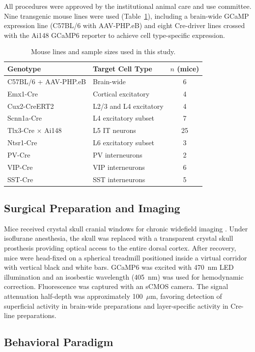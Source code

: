 \documentclass[11pt]{article}
\begin{document}
All procedures were approved by the institutional animal care and use committee. Nine transgenic mouse lines were used (Table~\ref{tab:mice}), including a brain-wide GCaMP expression line (C57BL/6 with AAV-PHP.eB) and eight Cre-driver lines crossed with the Ai148 GCaMP6 reporter to achieve cell type-specific expression.

\begin{table}[h]
\centering
\caption{Mouse lines and sample sizes used in this study.}
\label{tab:mice}
\begin{tabular}{llc}
\toprule
Genotype & Target Cell Type & $n$ (mice) \\
\midrule
C57BL/6 + AAV-PHP.eB & Brain-wide & 6 \\
Emx1-Cre & Cortical excitatory & 4 \\
Cux2-CreERT2 & L2/3 and L4 excitatory & 4 \\
Scnn1a-Cre & L4 excitatory subset & 7 \\
Tlx3-Cre $\times$ Ai148 & L5 IT neurons & 25 \\
Ntsr1-Cre & L6 excitatory subset & 3 \\
PV-Cre & PV interneurons & 2 \\
VIP-Cre & VIP interneurons & 6 \\
SST-Cre & SST interneurons & 5 \\
\bottomrule
\end{tabular}
\end{table}

\subsection{Surgical Preparation and Imaging}

Mice received crystal skull cranial windows for chronic widefield imaging \citep{kim2016}. Under isoflurane anesthesia, the skull was replaced with a transparent crystal skull prosthesis providing optical access to the entire dorsal cortex. After recovery, mice were head-fixed on a spherical treadmill positioned inside a virtual corridor with vertical black and white bars. GCaMP6 was excited with 470~nm LED illumination and an isosbestic wavelength (405~nm) was used for hemodynamic correction. Fluorescence was captured with an sCMOS camera. The signal attenuation half-depth was approximately 100~$\mu$m, favoring detection of superficial activity in brain-wide preparations and layer-specific activity in Cre-line preparations.

\subsection{Behavioral Paradigm}
\end{document}
